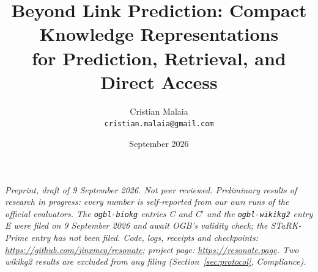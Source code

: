 \documentclass[11pt,a4paper]{article}
\title{Beyond Link Prediction: Compact Knowledge Representations\\ for Prediction, Retrieval, and Direct Access}
\author{Cristian Malaia\\ \texttt{cristian.malaia@gmail.com}}
\date{September 2026}
\begin{document}
\maketitle
\begin{center}\small\itshape
Preprint, draft of 9 September 2026. Not peer reviewed. Preliminary
results of research in progress: every number is self-reported from our
own runs of the official evaluators. The \texttt{ogbl-biokg} entries C and
C$'$ and the \texttt{ogbl-wikikg2} entry E were filed on 9 September 2026
and await OGB's validity check; the STaRK-Prime entry has not been filed. Code, logs, receipts and checkpoints:
\url{https://github.com/jinxmcg/resonate}; project page:
\url{https://resonate.page}. Two wikikg2
results are excluded from any filing (Section~\ref{sec:protocol}, Compliance).
\end{center}
\end{document}
